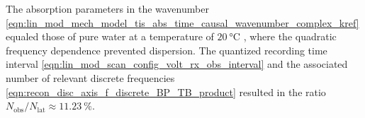 The absorption parameters in
the wavenumber
\eqref{eqn:lin_mod_mech_model_tis_abs_time_causal_wavenumber_complex_kref} equaled
those of
pure water at
a temperature of
$\SI{20}{\celsius}$
\cite[Table 4.8]{book:Duck1990}, where
the quadratic frequency dependence prevented
dispersion.
The quantized recording time interval
\eqref{eqn:lin_mod_scan_config_volt_rx_obs_interval} and
the associated number of
relevant discrete frequencies
\eqref{eqn:recon_disc_axis_f_discrete_BP_TB_product} resulted in
the ratio
$N_{\text{obs}} / N_{\text{lat}} \approx \SI{11.23}{\percent}$.

